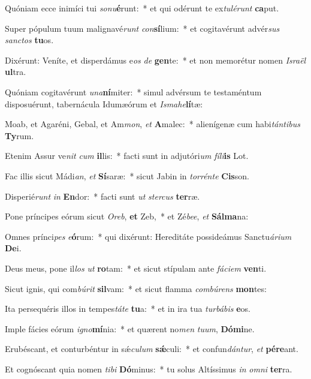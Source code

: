 \item Quóniam ecce inimíci tui \textit{so}\textit{nu}\textbf{é}runt:~* et qui odérunt te ex\textit{tu}\textit{lé}\textit{runt} \textbf{ca}put.
\item Super pópulum tuum malignavé\textit{runt} \textit{con}\textbf{sí}lium:~* et cogitavérunt advér\textit{sus} \textit{sanc}\textit{tos} \textbf{tu}os.
\item Dixérunt: Veníte, et disperdámus e\textit{os} \textit{de} \textbf{gen}te:~* et non memorétur nomen \textit{Is}\textit{ra}\textit{ël} \textbf{ul}tra.
\item Quóniam cogitavérunt \textit{u}\textit{na}\textbf{ní}miter:~* simul advérsum te testaméntum disposuérunt, tabernácula Idumæórum et \textit{Is}\textit{ma}\textit{he}\textbf{lí}tæ:
\item Moab, et Agaréni, Gebal, et Am\textit{mon}, \textit{et} \textbf{A}malec:~* alienígenæ cum habi\textit{tán}\textit{ti}\textit{bus} \textbf{Ty}rum.
\item Etenim Assur ve\textit{nit} \textit{cum} \textbf{il}lis:~* facti sunt in adjutóri\textit{um} \textit{fí}\textit{li}\textbf{is} Lot.
\item Fac illis sicut Mádi\textit{an}, \textit{et} \textbf{Sí}saræ:~* sicut Jabin in \textit{tor}\textit{rén}\textit{te} \textbf{Cis}son.
\item Disperié\textit{runt} \textit{in} \textbf{En}dor:~* facti sunt \textit{ut} \textit{ster}\textit{cus} \textbf{ter}ræ.
\item Pone príncipes eórum sicut \textit{O}\textit{reb}, \textbf{et} Zeb,~* et Zé\textit{be}\textit{e}, \textit{et} \textbf{Sál}\textbf{ma}na:
\item Omnes prínci\textit{pes} \textit{e}\textbf{ó}rum:~* qui dixérunt: Hereditáte possideámus Sanctu\textit{á}\textit{ri}\textit{um} \textbf{De}i.
\item Deus meus, pone il\textit{los} \textit{ut} \textbf{ro}tam:~* et sicut stípulam ante \textit{fá}\textit{ci}\textit{em} \textbf{ven}ti.
\item Sicut ignis, qui com\textit{bú}\textit{rit} \textbf{sil}vam:~* et sicut flamma \textit{com}\textit{bú}\textit{rens} \textbf{mon}tes:
\item Ita persequéris illos in tempes\textit{tá}\textit{te} \textbf{tu}a:~* et in ira tua \textit{tur}\textit{bá}\textit{bis} \textbf{e}os.
\item Imple fácies eórum \textit{i}\textit{gno}\textbf{mí}nia:~* et quærent no\textit{men} \textit{tu}\textit{um}, \textbf{Dó}\textbf{mi}ne.
\item Erubéscant, et conturbéntur in sǽ\textit{cu}\textit{lum} \textbf{sǽ}culi:~* et confun\textit{dán}\textit{tur}, \textit{et} \textbf{pér}\textbf{e}ant.
\item Et cognóscant quia nomen \textit{ti}\textit{bi} \textbf{Dó}minus:~* tu solus Altíssimus \textit{in} \textit{om}\textit{ni} \textbf{ter}ra.
